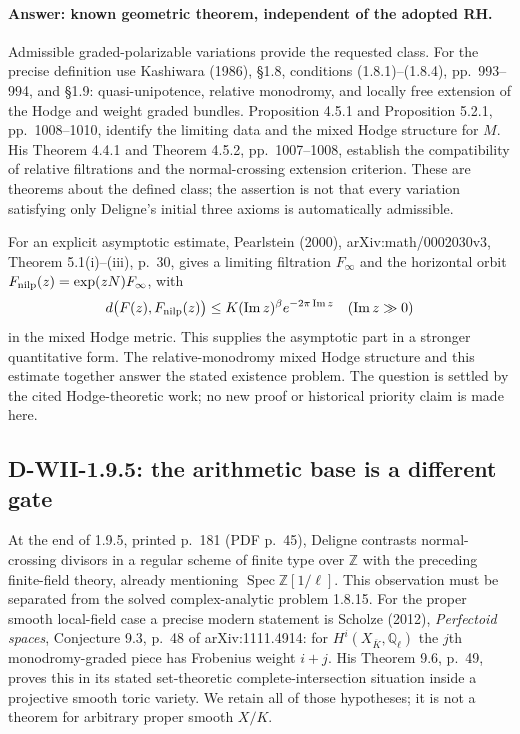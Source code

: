 \documentclass[11pt,a4paper]{article}
\theoremstyle{definition}\newtheorem{definition}[theorem]{Definition}
\theoremstyle{remark}\newtheorem{remark}[theorem]{Remark}
\begin{document}
\paragraph{Answer: known geometric theorem, independent of the adopted RH.}
Admissible graded-polarizable variations provide the requested class.
For the precise definition use Kashiwara (1986), \S1.8,
conditions (1.8.1)--(1.8.4), pp.~993--994, and \S1.9: quasi-unipotence,
relative monodromy, and locally free extension of the Hodge and weight
graded bundles. Proposition 4.5.1 and Proposition 5.2.1,
pp.~1008--1010, identify the limiting data and the mixed Hodge
structure for $M$. His Theorem 4.4.1 and Theorem 4.5.2,
pp.~1007--1008, establish the compatibility of relative filtrations
and the normal-crossing extension criterion. These are theorems about
the defined class; the assertion is not that every variation satisfying
only Deligne's initial three axioms is automatically admissible.

For an explicit asymptotic estimate, Pearlstein (2000),
arXiv:math/0002030v3, Theorem 5.1(i)--(iii), p.~30,
gives a limiting filtration $F_\infty$ and the horizontal orbit
$F_{\rm nilp}(z)=\exp(zN)F_\infty$, with
\[
 d\bigl(F(z),F_{\rm nilp}(z)\bigr)
 \leq K(\operatorname{Im}z)^\beta
                  e^{-2\pi\operatorname{Im}z}
 \quad(\operatorname{Im}z\gg0)
\]
in the mixed Hodge metric. This supplies the asymptotic part in a
stronger quantitative form. The relative-monodromy mixed Hodge
structure and this estimate together answer the stated existence
problem. The question is settled by the cited Hodge-theoretic work;
no new proof or historical priority claim is made here.

\subsection{D-WII-1.9.5: the arithmetic base is a different gate}

At the end of 1.9.5, printed p.~181 (PDF p.~45), Deligne contrasts
normal-crossing divisors in a regular scheme of finite type over
$\mathbb Z$ with the preceding finite-field theory, already mentioning
$\operatorname{Spec}\mathbb Z[1/\ell]$. This observation must be
separated from the solved complex-analytic problem 1.8.15.
For the proper smooth local-field case a precise modern statement is
Scholze (2012), \emph{Perfectoid spaces}, Conjecture 9.3, p.~48
of arXiv:1111.4914:
for $H^i(X_{\overline K},\mathbb Q_\ell)$ the $j$th monodromy-graded
piece has Frobenius weight $i+j$. His Theorem 9.6, p.~49, proves
this in its stated set-theoretic complete-intersection situation
inside a projective smooth toric variety. We retain all of those
hypotheses; it is not a theorem for arbitrary proper smooth $X/K$.
\end{document}
